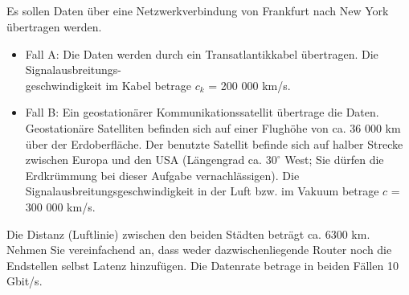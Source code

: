 \documentclass[a4paper]{article}
\begin{document}
\setcounter{section}{1}
\subsection{}
Es sollen Daten über eine Netzwerkverbindung von Frankfurt nach New York übertragen werden.
\begin{itemize}
    \item Fall A: Die Daten werden durch ein Transatlantikkabel übertragen. Die Signalausbreitungs-\\
    geschwindigkeit im Kabel betrage $c_k$ = 200 000 km/s.
    \item Fall B: Ein geostationärer Kommunikationssatellit übertrage die Daten. Geostationäre Satelliten befinden sich auf einer Flughöhe von ca. 36 000 km über der Erdoberfläche. Der benutzte Satellit befinde sich auf halber Strecke zwischen Europa und den USA (Längengrad ca. $30^\circ$ West; Sie dürfen die Erdkrümmung bei dieser Aufgabe vernachlässigen). Die Signalausbreitungsgeschwindigkeit in der Luft bzw. im Vakuum betrage $c$ = 300 000 km/s.
\end{itemize}
Die Distanz (Luftlinie) zwischen den beiden Städten beträgt ca. 6300 km. Nehmen Sie vereinfachend an, dass weder dazwischenliegende Router noch die Endstellen selbst Latenz hinzufügen. Die Datenrate betrage in beiden Fällen 10 Gbit/s.
\end{document}
